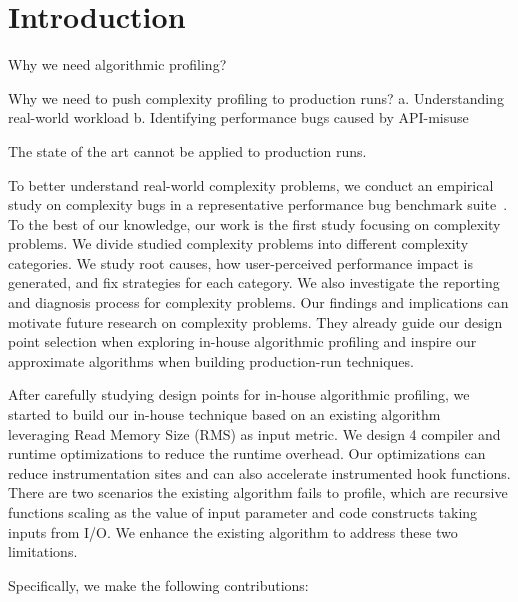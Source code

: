 \section{Introduction}
\label{sec:intro}

Why we need algorithmic profiling? 

Why we need to push complexity profiling to production runs? 
a. Understanding real-world workload
b. Identifying performance bugs caused by API-misuse

The state of the art cannot be applied to production runs. 

To better understand real-world complexity problems,
we conduct an empirical study on complexity bugs 
in a representative performance bug benchmark suite~\cite{PerfBug,SongOOPSLA2014}.
To the best of our knowledge, our work is the first study focusing on complexity problems.
We divide studied complexity problems into different complexity categories.    
We study root causes, how user-perceived performance impact is generated, 
and fix strategies for each category.
We also investigate the reporting and diagnosis process for complexity problems. 
Our findings and implications can motivate future research on complexity problems. 
They already guide our design point selection when exploring in-house algorithmic profiling 
and inspire our approximate algorithms when building production-run techniques. 

After carefully studying design points for in-house algorithmic profiling,
we started to build our in-house technique 
based on an existing algorithm~\cite{Aprof1,Aprof2} leveraging 
Read Memory Size (RMS) as input metric. 
We design 4 compiler and runtime optimizations to reduce the runtime overhead.
Our optimizations can reduce instrumentation sites 
and can also accelerate instrumented hook functions. 
There are two scenarios the existing algorithm fails to profile, 
which are recursive functions scaling as the value of input parameter 
and code constructs taking inputs from I/O.
We enhance the existing algorithm to address these two limitations. 



Specifically, we make the following contributions:

